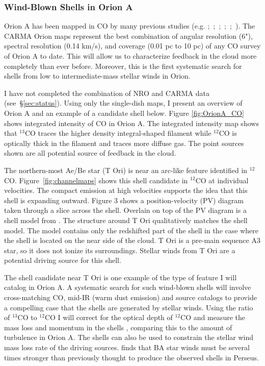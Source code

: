         \subsubsection{Wind-Blown Shells in Orion A}\label{sec:paper1}
Orion A has been mapped in CO by many previous studies (e.g. \citet{Bally87};~\citet{Wilson05};~\citet{Shimajiri11};~\citet{Buckle12};~\citet{Berne14};~\citet{Nishimura15}). The CARMA Orion maps represent the best combination of angular resolution (6"), spectral resolution (0.14 km/s), and coverage (0.01 pc to 10 pc) of any CO survey of Orion A to date. This will allow us to characterize feedback in the cloud more completely than ever before. Moreover, this is the first systematic search for shells from low to intermediate-mass stellar winds in Orion.
        
I have not completed the combination of NRO and CARMA data (see~\S\ref{sec:status}). Using only the single-dish maps, I present an overview of Orion A and an example of a candidate shell below. Figure \ref{fig:OrionA_CO} shows integrated intensity of CO in Orion A. The integrated intensity map shows that $^{13}$CO traces the higher density integral-shaped filament while $^{12}$CO is optically thick in the filament and traces more diffuse gas. The point sources shown are all potential source of feedback in the cloud.

The northern-most Ae/Be star (T Ori) is near an arc-like feature identified in $^{12}$CO. Figure~\ref{fig:channelmaps} shows this shell candidate in $^{12}$CO at individual velocities. The compact emission at high velocities supports the idea that this shell is expanding outward. Figure 3 shows a position-velocity (PV) diagram taken through a slice across the shell. Overlain on top of the PV diagram is a shell model from \citet{Arce_2011}. The structure around T Ori qualitatively matches the shell model. The model contains only the redshifted part of the shell in the case where the shell is located on the near side of the cloud.  T Ori is a pre-main sequence A3 star, so it does not ionize its surroundings. Stellar winds from T Ori are a potential driving source for this shell.

The shell candidate near T Ori is one example of the type of feature I will catalog in Orion A. A systematic search for such wind-blown shells will involve cross-matching CO, mid-IR (warm dust emission) and source catalogs to provide a compelling case that the shells are generated by stellar winds. Using the ratio of $^{13}$CO to $^{12}$CO I will correct for the optical depth of $^{12}$CO and measure the mass loss and momentum in the shells \cite{Arce_2011}, comparing this to the amount of turbulence in Orion A. The shells can also be used to constrain the stellar wind mass loss rate of the driving sources. \citet{Offner15} finds that BA star winds must be several times stronger than previously thought to produce the observed shells in Perseus.

